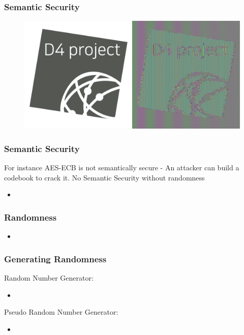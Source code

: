 \documentclass{beamer}
\begin{document}
\begin{frame}
        \frametitle{Semantic Security}
        \begin{figure}
          \centering
          \includegraphics[width=\textwidth]{d4-ecb.pdf}
        \end{figure}
        
\end{frame}


\begin{frame}
        \frametitle{Semantic Security}
For instance AES-ECB is not semantically secure - An attacker can build a
codebook to crack it.
        No Semantic Security without randomness

        \begin{itemize}
          \item
        \end{itemize}

\end{frame}

\begin{frame}
        \frametitle{Randomness}

        \begin{itemize}
          \item
        \end{itemize}

\end{frame}



\begin{frame}
        \frametitle{Generating Randomness}

        Random Number Generator:
        \begin{itemize}
          \item
        \end{itemize}

        Pseudo Random Number Generator:
        \begin{itemize}
          \item
        \end{itemize}

\end{frame}
\end{document}
